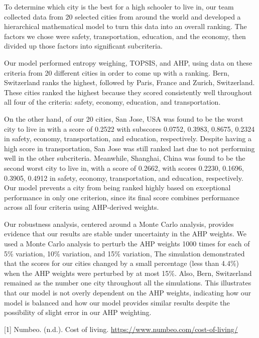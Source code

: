 \documentclass[11pt,letterpaper]{article}
\makeatletter
\renewcommand{\section}{\@startsection{section}{1}{0pt}{2.0ex plus .5ex}{0.8ex}{\normalfont\fontsize{16}{19}\selectfont\bfseries}}
\makeatother
\begin{document}
To determine which city is the best for a high schooler to live in, our team collected data from 20 selected cities from around the world and developed a hierarchical mathematical model to turn this data into an overall ranking. The factors we chose were safety, transportation, education, and the economy, then divided up those factors into significant subcriteria.

Our model performed entropy weighing, TOPSIS, and AHP, using data on these criteria from 20 different cities in order to come up with a ranking. Bern, Switzerland ranks the highest, followed by Paris, France and Zurich, Switzerland. These cities ranked the highest because they scored consistently well throughout all four of the criteria: safety, economy, education, and transportation.

On the other hand, of our 20 cities, San Jose, USA was found to be the worst city to live in with a score of 0.2522 with subscores 0.0752, 0.3983, 0.8675, 0.2324 in safety, economy, transportation, and education, respectively. Despite having a high score in transportation, San Jose was still ranked last due to not performing well in the other subcriteria. Meanwhile, Shanghai, China was found to be the second worst city to live in, with a score of 0.2662, with scores 0.2230, 0.1696, 0.3905, 0.4912 in safety, economy, transportation, and education, respectively. Our model prevents a city from being ranked highly based on exceptional performance in only one criterion, since its final score combines performance across all four criteria using AHP-derived weights.

Our robustness analysis, centered around a Monte Carlo analysis, provides evidence that our results are stable under uncertainty in the AHP weights. We used a Monte Carlo analysis to perturb the AHP weights 1000 times for each of 5\% variation, 10\% variation, and 15\% variation, The simulation demonstrated that the scores for our cities changed by a small percentage (less than 4.4\%) when the AHP weights were perturbed by at most 15\%. Also, Bern, Switzerland remained as the number one city throughout all the simulations. This illustrates that our model is not overly dependent on the AHP weights, indicating how our model is balanced and how our model provides similar results despite the possibility of slight error in our AHP weighting.

\section{References}\label{tocentry:10-0}
[1] Numbeo. (n.d.). Cost of living. \url{https://www.numbeo.com/cost-of-living/}
\end{document}
